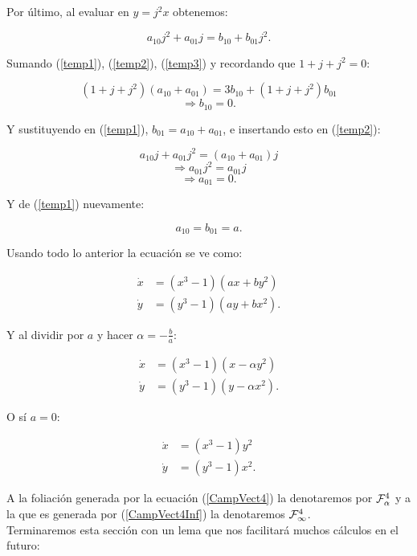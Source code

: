 Por último, al evaluar en $y=j^{2}x$ obtenemos:

\begin{equation}
\label{temp3}
a_{10}j^{2} + a_{01}j = b_{10} + b_{01}j^{2}.
\end{equation}

Sumando (\ref{temp1}), (\ref{temp2}), (\ref{temp3}) y recordando que $1 + j + j^{2} = 0$:

$$(1 + j + j^{2})(a_{10} + a_{01}) = 3b_{10} + (1+j +j^{2})b_{01}$$
$$\Rightarrow b_{10}=0.$$

Y sustituyendo en (\ref{temp1}), $b_{01}=a_{10} + a_{01}$, e insertando esto en (\ref{temp2}):

$$ a_{10}j + a_{01}j^{2 }= (a_{10} + a_{01})j$$
$$ \Rightarrow a_{01}j^{2} = a_{01}j$$
$$ \Rightarrow a_{01} = 0.$$

Y de (\ref{temp1}) nuevamente:

$$a_{10} = b_{01} = a.$$

Usando todo lo anterior la ecuación se ve como:

\begin{align*}
\dot{x} &= (x^{3}-1)(ax + by^{2}) \\
\dot{y} &= (y^{3}-1)(ay + bx^{2}).
\end{align*}

Y al dividir por $a$ y hacer $\alpha = -\frac{b}{a}$:

\begin{equation}
\label{CampVect4}
\begin{aligned}
\dot{x} &= (x^{3}-1)(x - \alpha y^{2}) \\
\dot{y} &= (y^{3}-1)(y - \alpha x^{2}).
\end{aligned}
\end{equation}

O sí $a = 0$:

\begin{equation}
\label{CampVect4Inf}
\begin{aligned}
\dot{x} &= (x^{3}-1)y^{2} \\
\dot{y} &= (y^{3}-1)x^{2}.
\end{aligned}
\end{equation}

A la foliación generada por la ecuación (\ref{CampVect4}) la denotaremos por $\Fol[4]{\alpha}$ y a la que es generada por (\ref{CampVect4Inf}) la denotaremos $\Fol[4]{\infty}$.\\

Terminaremos esta sección con un lema que nos facilitará muchos cálculos en el futuro:

